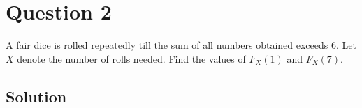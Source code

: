 \section*{Question 2}

A fair dice is rolled repeatedly till the sum of all numbers obtained exceeds 6.
Let \( X \) denote the number of rolls needed.
Find the values of \( F_{X}(1) \) and \( F_{X}(7) \).

\subsection*{Solution}
